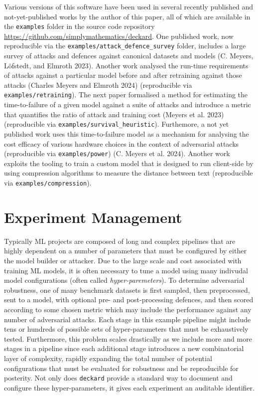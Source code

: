 \documentclass[
]{article}
\begin{document}
Various versions of this software have been used in several recently
published and not-yet-published works by the author of this paper, all
of which are available in the \texttt{examples} folder in the source
code repository \url{https://github.com/simplymathematics/deckard}. One
published work, now reproducible via the
\texttt{examples/attack\_defence\_survey} folder, includes a large
survey of attacks and defences against canonical datasets and models (C.
Meyers, Löfstedt, and Elmroth 2023). Another work analysed the run-time
requirements of attacks against a particular model before and after
retraining against those attacks (Charles Meyers and Elmroth 2024)
(reproducible via \texttt{examples/retraining}). The next paper
formalised a method for estimating the time-to-failure of a given model
against a suite of attacks and introduce a metric that quantifies the
ratio of attack and training cost (Meyers et al. 2023) (reproducible via
\texttt{examples/survival\_heuristic}). Furthemore, a not yet published
work uses this time-to-failure model as a mechanism for analysing the
cost efficacy of various hardware choices in the context of adversarial
attacks (reproducible via \texttt{examples/power}) (C. Meyers et al.
2024). Another work exploits the tooling to train a custom model that is
designed to run client-side by using compression algorithms to measure
the distance between text (reproducible via
\texttt{examples/compression}).

\hypertarget{experiment-management}{%
\section{Experiment Management}\label{experiment-management}}

Typically ML projects are composed of long and complex pipelines that
are highly dependent on a number of parameters that must be configured
by either the model builder or attacker. Due to the large scale and cost
associated with training ML models, it is often necessary to tune a
model using many indivudal model configurations (often called
\emph{hyper-paremeters}). To determine adversarial robustness, one of
many benchmark datasets is first sampled, then preprocessed, sent to a
model, with optional pre- and post-processing defences, and then scored
according to some chosen metric which may include the performance
against any number of adversarial attacks. Each stage in this example
pipeline might include tens or hundreds of possible sets of
hyper-parameters that must be exhaustively tested. Furthermore, this
problem scales drastically as we include more and more stages in a
pipeline since each additional stage introduces a new combinatorial
layer of complexity, rapidly expanding the total number of potential
configurations that must be evaluated for robustness and be reproducible
for posterity. Not only does \texttt{deckard} provide a standard way to
document and configure these hyper-parameters, it gives each experiment
an auditable identifier.
\end{document}
